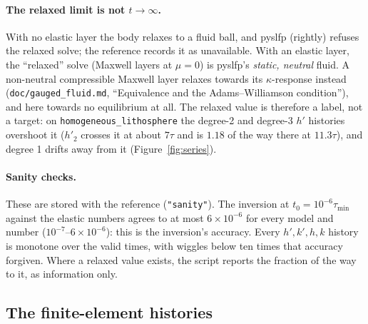 \documentclass[11pt]{article}
\numberwithin{equation}{section}
\newcommand{\code}[1]{\texttt{#1}}
\begin{document}
\paragraph{The relaxed limit is not $t\to\infty$.}
With no elastic layer the body relaxes to a fluid ball, and pyslfp
(rightly) refuses the relaxed solve; the reference records it as
unavailable. With an elastic layer, the ``relaxed'' solve (Maxwell layers
at $\mu=0$) is pyslfp's \emph{static, neutral} fluid. A non-neutral
compressible Maxwell layer relaxes towards its $\kappa$-response instead
(\code{doc/gauged\_fluid.md}, ``Equivalence and the Adams--Williamson
condition''), and here towards no equilibrium at all. The relaxed value
is therefore a label, not a target: on \code{homogeneous\_lithosphere} the
degree-2 and degree-3 $h'$ histories overshoot it ($h'_2$ crosses it at
about $7\tau$ and is $1.18$ of the way there at $11.3\tau$), and degree 1
drifts away from it (Figure~\ref{fig:series}).

\paragraph{Sanity checks.}
These are stored with the reference (\code{"sanity"}). The inversion at
$t_0=10^{-6}\tau_{\min}$ against the elastic numbers agrees to at most
$6\times10^{-6}$ for every model and number ($10^{-7}$--$6\times10^{-6}$):
this is the inversion's accuracy. Every $h',k',h,k$ history is monotone
over the valid times, with wiggles below ten times that accuracy forgiven.
Where a relaxed value exists, the script reports the fraction of the way
to it, as information only.

\subsection{The finite-element histories}
\label{sec:fe-histories}
\end{document}
